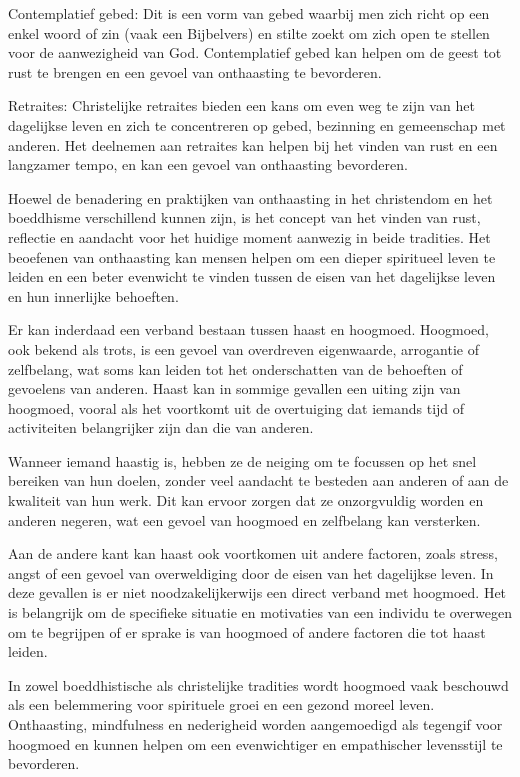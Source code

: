 Contemplatief gebed: Dit is een vorm van gebed waarbij men zich richt op een enkel woord of zin (vaak een Bijbelvers) en stilte zoekt om zich open te stellen voor de aanwezigheid van God. Contemplatief gebed kan helpen om de geest tot rust te brengen en een gevoel van onthaasting te bevorderen.

Retraites: Christelijke retraites bieden een kans om even weg te zijn van het dagelijkse leven en zich te concentreren op gebed, bezinning en gemeenschap met anderen. Het deelnemen aan retraites kan helpen bij het vinden van rust en een langzamer tempo, en kan een gevoel van onthaasting bevorderen.

Hoewel de benadering en praktijken van onthaasting in het christendom en het boeddhisme verschillend kunnen zijn, is het concept van het vinden van rust, reflectie en aandacht voor het huidige moment aanwezig in beide tradities. Het beoefenen van onthaasting kan mensen helpen om een dieper spiritueel leven te leiden en een beter evenwicht te vinden tussen de eisen van het dagelijkse leven en hun innerlijke behoeften.

Er kan inderdaad een verband bestaan tussen haast en hoogmoed. Hoogmoed, ook bekend als trots, is een gevoel van overdreven eigenwaarde, arrogantie of zelfbelang, wat soms kan leiden tot het onderschatten van de behoeften of gevoelens van anderen. Haast kan in sommige gevallen een uiting zijn van hoogmoed, vooral als het voortkomt uit de overtuiging dat iemands tijd of activiteiten belangrijker zijn dan die van anderen.

Wanneer iemand haastig is, hebben ze de neiging om te focussen op het snel bereiken van hun doelen, zonder veel aandacht te besteden aan anderen of aan de kwaliteit van hun werk. Dit kan ervoor zorgen dat ze onzorgvuldig worden en anderen negeren, wat een gevoel van hoogmoed en zelfbelang kan versterken.

Aan de andere kant kan haast ook voortkomen uit andere factoren, zoals stress, angst of een gevoel van overweldiging door de eisen van het dagelijkse leven. In deze gevallen is er niet noodzakelijkerwijs een direct verband met hoogmoed. Het is belangrijk om de specifieke situatie en motivaties van een individu te overwegen om te begrijpen of er sprake is van hoogmoed of andere factoren die tot haast leiden.

In zowel boeddhistische als christelijke tradities wordt hoogmoed vaak beschouwd als een belemmering voor spirituele groei en een gezond moreel leven. Onthaasting, mindfulness en nederigheid worden aangemoedigd als tegengif voor hoogmoed en kunnen helpen om een evenwichtiger en empathischer levensstijl te bevorderen.

